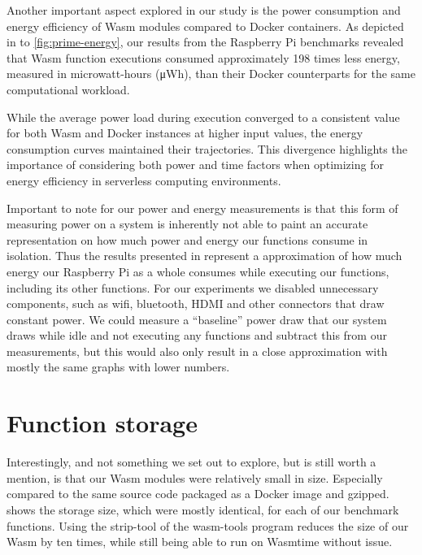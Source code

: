 \documentclass[
  table]{report}
\begin{document}
Another important aspect explored in our study is the power consumption
and energy efficiency of \ac{Wasm} modules compared to Docker
containers. As depicted in  to
\cref{fig:prime-energy}, our results from the Raspberry Pi benchmarks
revealed that \ac{Wasm} function executions consumed approximately 198
times less energy, measured in microwatt-hours (μWh), than their Docker
counterparts for the same computational workload.

While the average power load during execution converged to a consistent
value for both \ac{Wasm} and Docker instances at higher input values,
the energy consumption curves maintained their trajectories. This
divergence highlights the importance of considering both power and time
factors when optimizing for energy efficiency in serverless computing
environments.

Important to note for our power and energy measurements is that this
form of measuring power on a system is inherently not able to paint an
accurate representation on how much power and energy our functions
consume in isolation. Thus the results presented in 
represent a approximation of how much energy our Raspberry Pi as a whole
consumes while executing our functions, including its other functions.
For our experiments we disabled unnecessary components, such as wifi,
bluetooth, HDMI and other connectors that draw constant power. We could
measure a ``baseline'' power draw that our system draws while idle and
not executing any functions and subtract this from our measurements, but
this would also only result in a close approximation with mostly the
same graphs with lower numbers.

\section{Function storage}
\label{sect:func_storage}

Interestingly, and not something we set out to explore, but is still
worth a mention, is that our \ac{Wasm} modules were relatively small in
size. Especially compared to the same source code packaged as a Docker
image and gzipped.  shows the storage size,
which were mostly identical, for each of our benchmark functions. Using
the strip-tool of the wasm-tools program reduces the size of our
\ac{Wasm} by ten times, while still being able to run on Wasmtime
without issue.
\end{document}
